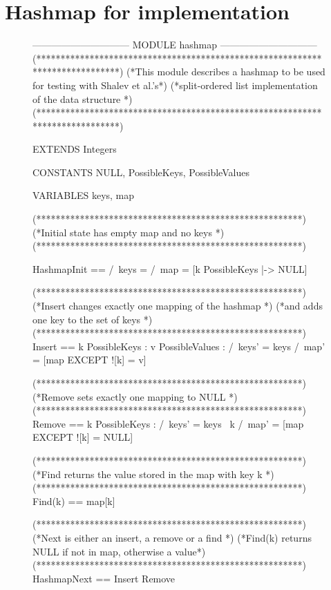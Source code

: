 \documentclass{uit-thesis}
\begin{document}
\section{Hashmap for implementation}
\begin{figure}
    \begin{tla}
        ------------------------------ MODULE hashmap ------------------------------
(*****************************************************************************)
(*This module describes a hashmap to be used for testing with Shalev et al.'s*)
(*split-ordered list implementation of the data structure                    *)
(*****************************************************************************)

EXTENDS Integers

CONSTANTS NULL, PossibleKeys, PossibleValues

VARIABLES keys, map


(*******************************************************)
(*Initial state has empty map and no keys              *)
(*******************************************************)

HashmapInit ==  /\ keys = {}
                /\ map = [k \in PossibleKeys |-> NULL]

(*******************************************************)
(*Insert changes exactly one mapping of the hashmap    *)
(*and adds one key to the set of keys                  *)
(*******************************************************)
Insert ==   \exists k \in PossibleKeys :
                \exists v \in PossibleValues :
                    /\ keys' = keys 
                    /\ map' = [map EXCEPT ![k] = v]

(*******************************************************)
(*Remove sets exactly one mapping to NULL              *)
(*******************************************************)
Remove ==   \exists k \in PossibleKeys :
                /\ keys' = keys \ {k}
                /\ map' = [map EXCEPT ![k] = NULL]

(*******************************************************)
(*Find returns the value stored in the map with key k  *)
(*******************************************************)
Find(k) == map[k]

(*******************************************************)
(*Next is either an insert, a remove or a find         *)
(*Find(k) returns NULL if not in map, otherwise a value*)
(*******************************************************)          
HashmapNext ==  \/ Insert
                \/ Remove



\end{tla}
\end{figure}
\end{document}
